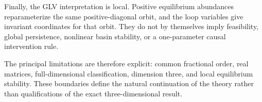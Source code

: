 Finally, the GLV interpretation is local. Positive equilibrium abundances reparameterize the same positive-diagonal orbit, and the loop variables give invariant coordinates for that orbit. They do not by themselves imply feasibility, global persistence, nonlinear basin stability, or a one-parameter causal intervention rule.

The principal limitations are therefore explicit: common fractional order, real matrices, full-dimensional classification, dimension three, and local equilibrium stability. These boundaries define the natural continuation of the theory rather than qualifications of the exact three-dimensional result.
